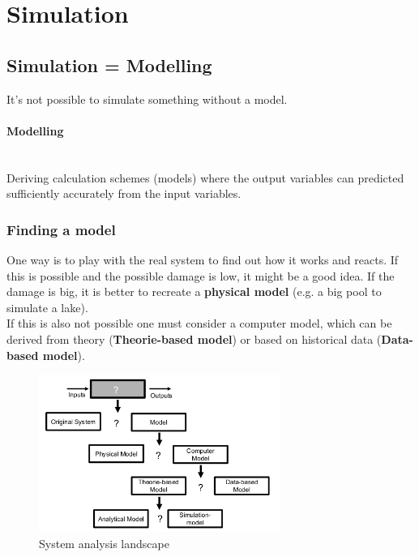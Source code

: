 \section{Simulation}

\subsection{Simulation = Modelling}

It's not possible to simulate something without a model.

\paragraph{Modelling}\mbox{}\\
Deriving calculation schemes (models) where the output variables can
predicted sufficiently accurately from the input variables.

\subsubsection{Finding a model}

One way is to play with the real system to find out how it works and
reacts. If this is possible and the possible damage is low, it might be
a good idea. If the damage is big, it is better to recreate a \textbf{physical
model} (e.g. a big pool to simulate a lake).\\
If this is also not possible one must consider a computer model, which
can be derived from theory (\textbf{Theorie-based model}) or based on
historical data (\textbf{Data-based model}).

\begin{figure}[H]
\centering
\includegraphics[width=0.7\textwidth]{figures/system_analysis_landscape.png}
\caption{System analysis landscape}
\end{figure}


